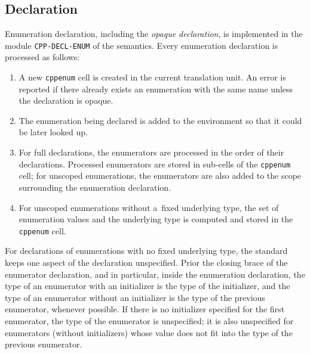 \documentclass[nolot,nolof,nocover,printed]{fithesis3}
\begin{document}

\subsection{Declaration}

Enumeration declaration, including the \textit{opaque declaration}, is implemented in the module \texttt{CPP-DECL-ENUM} of the semantics.
Every enumeration declaration is processed as follows:
\begin{enumerate}
\item A new \texttt{cppenum} cell is created in the current translation unit. An error is reported if there already exists an enumeration with the same name unless the declaration is opaque.
\item The enumeration being declared is added to the environment so that it could be later looked up.
\item For full declarations, the enumerators are processed in the order of their declarations. Processed enumerators are stored in sub-cells of the \texttt{cppenum} cell; for unscoped enumerations, the enumerators are also added to the scope surrounding the enumeration declaration.
\item For unscoped enumerations without a~fixed underlying type, the set of enumeration values and the underlying type is computed and stored in the \texttt{cppenum} cell.
\end{enumerate}

For declarations of enumerations with no fixed underlying type, the standard keeps one aspect of the declaration unspecified. Prior the closing brace of the enumerator declaration, and in particular, inside the enumeration declaration, the type of an enumerator with an initializer is the type of the initializer, and the type of an enumerator without an initializer is the type of the previous enumerator, whenever possible. If there is no initializer specified for the first enumerator, the type of the enumerator is unspecified; it is also unspecified for enumerators (without initializers) whose value does not fit into the type of the previous enumerator. 
\end{document}
